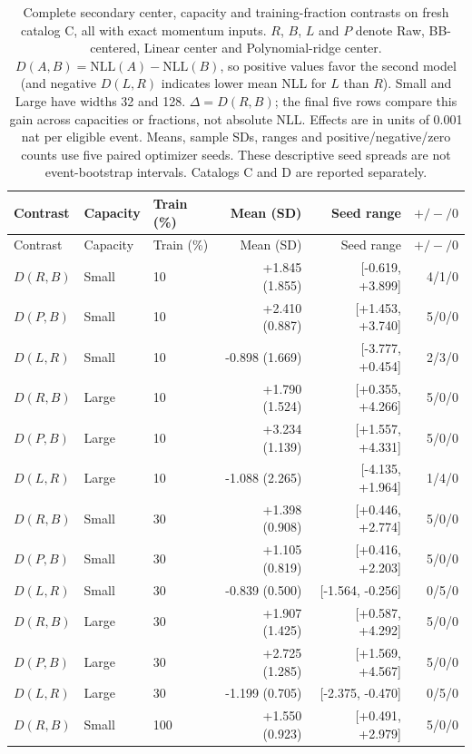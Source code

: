 \begingroup
\small
\setlength{\tabcolsep}{3pt}
\begin{longtable}{lllrrr}
\caption{Complete secondary center, capacity and training-fraction contrasts on fresh catalog C, all with exact momentum inputs. $R$, $B$, $L$ and $P$ denote Raw, BB-centered, Linear center and Polynomial-ridge center. $D(A,B)=\mathrm{NLL}(A)-\mathrm{NLL}(B)$, so positive values favor the second model (and negative $D(L,R)$ indicates lower mean NLL for $L$ than $R$). Small and Large have widths 32 and 128. $\Delta=D(R,B)$; the final five rows compare this gain across capacities or fractions, not absolute NLL. Effects are in units of 0.001 nat per eligible event. Means, sample SDs, ranges and positive/negative/zero counts use five paired optimizer seeds. These descriptive seed spreads are not event-bootstrap intervals. Catalogs C and D are reported separately.}\label{tab:editorial-secondary-current-C}\\
\toprule Contrast & Capacity & Train (\%) & Mean (SD) & Seed range & $+/-/0$\\ \midrule \endfirsthead
\toprule Contrast & Capacity & Train (\%) & Mean (SD) & Seed range & $+/-/0$\\ \midrule \endhead
$D(R,B)$ & Small & 10 & +1.845 (1.855) & [-0.619, +3.899] & 4/1/0\\
$D(P,B)$ & Small & 10 & +2.410 (0.887) & [+1.453, +3.740] & 5/0/0\\
$D(L,R)$ & Small & 10 & -0.898 (1.669) & [-3.777, +0.454] & 2/3/0\\
\midrule
$D(R,B)$ & Large & 10 & +1.790 (1.524) & [+0.355, +4.266] & 5/0/0\\
$D(P,B)$ & Large & 10 & +3.234 (1.139) & [+1.557, +4.331] & 5/0/0\\
$D(L,R)$ & Large & 10 & -1.088 (2.265) & [-4.135, +1.964] & 1/4/0\\
\midrule
$D(R,B)$ & Small & 30 & +1.398 (0.908) & [+0.446, +2.774] & 5/0/0\\
$D(P,B)$ & Small & 30 & +1.105 (0.819) & [+0.416, +2.203] & 5/0/0\\
$D(L,R)$ & Small & 30 & -0.839 (0.500) & [-1.564, -0.256] & 0/5/0\\
\midrule
$D(R,B)$ & Large & 30 & +1.907 (1.425) & [+0.587, +4.292] & 5/0/0\\
$D(P,B)$ & Large & 30 & +2.725 (1.285) & [+1.569, +4.567] & 5/0/0\\
$D(L,R)$ & Large & 30 & -1.199 (0.705) & [-2.375, -0.470] & 0/5/0\\
\midrule
$D(R,B)$ & Small & 100 & +1.550 (0.923) & [+0.491, +2.979] & 5/0/0\\

\end{longtable}
